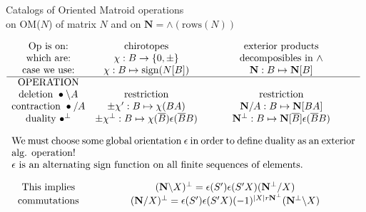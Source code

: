 \documentclass{beamer}
\newcommand{\ext}[1]{\ensuremath{\mathbf{#1}}}
\begin{document}
\begin{frame}{Catalogs of Oriented Matroid operations\\
    on  OM($N$) of matrix $N$ and on
    $\ext{N}=\wedge(\text{rows}(N))$}

\hspace*{-0.35in}$
    \begin{array}{ccc}
      \text{Op is on:}         &  \text{chirotopes}
                                      & \text{exterior products} \\
      \text{which are:}        & \chi:B\rightarrow \{0,\pm \}
                                      & \text{decomposibles in\ } \wedge \\ 
      \text{case we use:}      & \chi:B\mapsto\text{sign}(N[B])
                                      &  \ext{N}:B\mapsto\ext{N}[B] \\
      \hline
      \text{OPERATION}         &  & \\
\text{deletion\ } \bullet\backslash A  & \text{restriction} & \text{restriction}  \\
\text{contraction\ }\bullet / A             & \pm\chi':B\mapsto\chi(BA) & \ext{N}/A:B\mapsto\ext{N}[BA] \\

\text{duality\ }\bullet^{\perp} & \pm\chi^{\perp}:B\mapsto\chi(\overline{B})\epsilon(\overline{B}B) &
\ext{N}^{\perp}:B\mapsto\ext{N}[\overline{B}]\epsilon(\overline{B}B) \\ \\
\multicolumn{3}{c}{\parbox{\textwidth}{We must choose some global orientation $\epsilon$ in order to define duality as an exterior alg. operation!
    \\
    $\epsilon$ is an alternating sign function on all finite sequences of elements. }}\\ \\ 
\text{This implies} & \multicolumn{2}{c}{(\ext{N}\backslash X)^\perp = \epsilon(S')\epsilon(S'X)(\ext{N}^\perp/X)}  \\
\text{commutations} & \multicolumn{2}{c}{(\ext{N}/X)^\perp = \epsilon(S')\epsilon(S'X)(-1)^{|X|r\ext{N}^\perp}(\ext{N}^\perp\backslash X)}\\

    \end{array}
    $
\end{frame}
\end{document}
